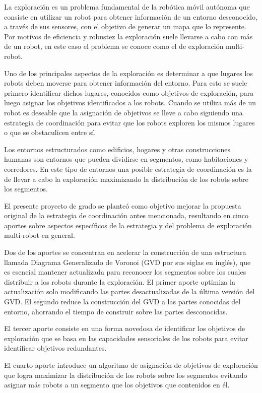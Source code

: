 La exploración es un problema fundamental de la robótica móvil autónoma que
consiste en utilizar un robot para obtener información de un entorno
desconocido, a través de sus sensores, con el objetivo de generar un mapa que lo
represente. Por motivos de eficiencia y robustez la exploración suele llevarse
a cabo con más de un robot, en este caso el problema se conoce como el de
exploración multi-robot.

Uno de los principales aspectos de la exploración es determinar a que lugares
los robots deben moverse para obtener información del entorno. Para esto se
suele primero identificar dichos lugares, conocidos como objetivos de
exploración, para luego asignar los objetivos identificados a los robots.
Cuando se utiliza más de un robot es deseable que la asignación de objetivos se
lleve a cabo siguiendo una estrategia de coordinación para evitar que los
robots exploren los mismos lugares o que se obstaculicen entre sí.

Los entornos estructurados como edificios, hogares y otras construcciones
humanas son entornos que pueden dividirse en segmentos, como habitaciones
y corredores. En este tipo de entornos una posible estrategia de coordinación 
es la de llevar a cabo la exploración maximizando la distribución de los
robots sobre los segmentos. 

El presente proyecto de grado se planteó como objetivo mejorar la propuesta
original de la estrategia de coordinación antes mencionada, resultando en cinco
aportes sobre aspectos específicos de la estrategia y del problema de
exploración multi-robot en general.

Dos de los aportes se concentran en acelerar la construcción de una
estructura llamada Diagrama Generalizado de Voronoi (GVD por sus siglas en
inglés), que es esencial mantener actualizada para reconocer los segmentos
sobre los cuales distribuir a los robots durante la exploración. El primer
aporte optimiza la actualización solo modificando las partes desactualizadas 
de la última versión del GVD. El segundo reduce la construcción del GVD a las
partes conocidas del entorno, ahorrando el tiempo de construir sobre las
partes desconocidas.

El tercer aporte consiste en una forma novedosa de identificar los objetivos de exploración
que se basa en las capacidades sensoriales de los robots para evitar
identificar objetivos redundantes.

El cuarto aporte introduce un algoritmo de asignación de objetivos de exploración
que logra maximizar la distribución de los robots sobre los segmentos evitando
asignar más robots a un segmento que los objetivos que contenidos en él.

